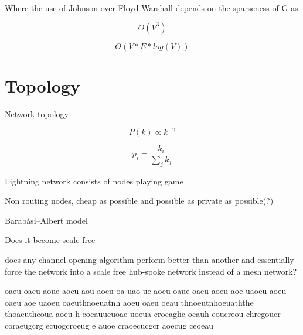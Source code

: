 Where the use of Johnson over Floyd-Warshall depends on the sparseness of G as

\[ O(V^3) \]

\[ O(V*E*log(V)) \]
\section{Topology}

Network topology

\[ P(k) \propto k^{-\gamma} \]

\[ p_i = \dfrac{k_i}{\sum_{j}^{}k_j}  \]


Lightning network consists of nodes playing game

Non routing nodes, cheap as possible and possible as private as possible(?) 

Barabási–Albert model

Does it become scale free

does any channel opening algorithm perform better than another and essentially force the network into a scale free hub-spoke network instead of a mesh network?
 
oaeu
oaeu
aoue
aoeu
aou
aoeu
oa
uao
ue
aoeu
oaue
oaeu
aoeu
aoe
uaoeu aoeu oaeu aoe uaoeu oaeuthnoeuatnh 
aoeu oaeu oeau thnoeutnhoeuaththe thoaeutheoua 
aoeu h
coeauueuoae uoeua croeaghc oeauh eoucreou chregoucr 
coraeugcrg ecuogcroeug e auoe craoecucgcr aoecug ceoeau 


\newpage
\onecolumn

